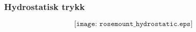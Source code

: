 \documentclass[aspectratio=169,xcolor=dvipsnames]{beamer}
\begin{document}
%
%
%
%
\begin{frame}
	\frametitle{Hydrostatisk trykk}

$$\texttt{[image: rosemount\_hydrostatic.eps]}$$
\end{frame}
%
%
%
%
%
%
%
%
%
%
%
%
\end{document}
